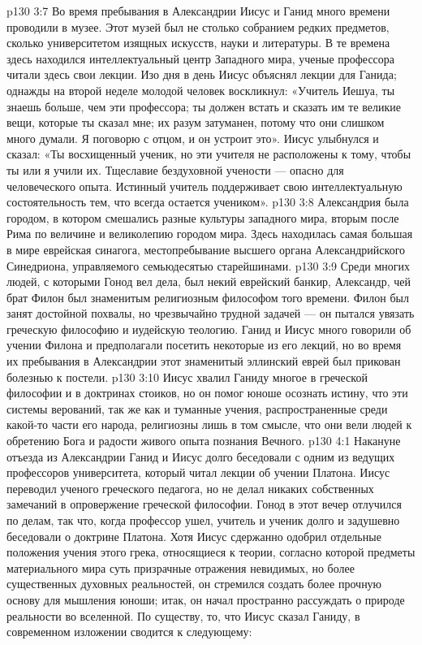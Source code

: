 \vs p130 3:7 \pc Во время пребывания в Александрии Иисус и Ганид много времени проводили в музее. Этот музей был не столько собранием редких предметов, сколько университетом изящных искусств, науки и литературы. В те времена здесь находился интеллектуальный центр Западного мира, ученые профессора читали здесь свои лекции. Изо дня в день Иисус объяснял лекции для Ганида; однажды на второй неделе молодой человек воскликнул: «Учитель Иешуа, ты знаешь больше, чем эти профессора; ты должен встать и сказать им те великие вещи, которые ты сказал мне; их разум затуманен, потому что они слишком много думали. Я поговорю с отцом, и он устроит это». Иисус улыбнулся и сказал: «Ты восхищенный ученик, но эти учителя не расположены к тому, чтобы ты или я учили их. Тщеславие бездуховной учености --- опасно для человеческого опыта. Истинный учитель поддерживает свою интеллектуальную состоятельность тем, что всегда остается учеником».
\vs p130 3:8 Александрия была городом, в котором смешались разные культуры западного мира, вторым после Рима по величине и великолепию городом мира. Здесь находилась самая большая в мире еврейская синагога, местопребывание высшего органа Александрийского Синедриона, управляемого семьюдесятью старейшинами.
\vs p130 3:9 Среди многих людей, с которыми Гонод вел дела, был некий еврейский банкир, Александр, чей брат Филон был знаменитым религиозным философом того времени. Филон был занят достойной похвалы, но чрезвычайно трудной задачей --- он пытался увязать греческую философию и иудейскую теологию. Ганид и Иисус много говорили об учении Филона и предполагали посетить некоторые из его лекций, но во время их пребывания в Александрии этот знаменитый эллинский еврей был прикован болезнью к постели.
\vs p130 3:10 Иисус хвалил Ганиду многое в греческой философии и в доктринах стоиков, но он помог юноше осознать истину, что эти системы верований, так же как и туманные учения, распространенные среди какой\hyp{}то части его народа, религиозны лишь в том смысле, что они вели людей к обретению Бога и радости живого опыта познания Вечного.
\vs p130 4:1 Накануне отъезда из Александрии Ганид и Иисус долго беседовали с одним из ведущих профессоров университета, который читал лекции об учении Платона. Иисус переводил ученого греческого педагога, но не делал никаких собственных замечаний в опровержение греческой философии. Гонод в этот вечер отлучился по делам, так что, когда профессор ушел, учитель и ученик долго и задушевно беседовали о доктрине Платона. Хотя Иисус сдержанно одобрил отдельные положения учения этого грека, относящиеся к теории, согласно которой предметы материального мира суть призрачные отражения невидимых, но более существенных духовных реальностей, он стремился создать более прочную основу для мышления юноши; итак, он начал пространно рассуждать о природе реальности во вселенной. По существу, то, что Иисус сказал Ганиду, в современном изложении сводится к следующему:
